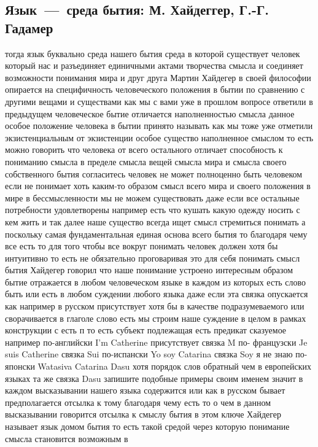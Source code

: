 \subsection{Язык~---~среда бытия: М. Хайдеггер, Г.-Г. Гадамер}
тогда язык буквально среда нашего бытия среда в которой существует человек
который нас и разъединяет единичными актами творчества смысла и соединяет
возможности понимания мира и друг друга Мартин Хайдегер в своей философии
опирается на специфичность человеческого положения в бытии по сравнению с
другими вещами и существами как мы с вами уже в прошлом вопросе ответили в
предыдущем человеческое бытие отличается наполненностью смысла данное особое
положение человека в бытии принято называть как мы тоже уже отметили
экзистенциальным от экзистенции особое существо наполненное смыслом то есть
можно говорить что человека от всего остального отличает способность к пониманию
смысла в пределе смысла вещей смысла мира и смысла своего собственного бытия
согласитесь человек не может полноценно быть человеком если не понимает хоть
каким-то образом смысл всего мира и своего положения в мире в бессмысленности мы
не можем существовать даже если все остальные потребности удовлетворены например
есть что кушать какую одежду носить с кем жить и так далее наше существо всегда
ищет смысл стремиться понимать а поскольку самая фундаментальная единая основа
всего бытия то благодаря чему все есть то для того чтобы все вокруг понимать
человек должен хотя бы интуитивно то есть не обязательно проговаривая это для
себя понимать смысл бытия Хайдегер говорил что наше понимание устроено
интересным образом бытие отражается в любом человеческом языке в каждом из
которых есть слово быть или есть в любом суждении любого языка даже если эта
связка опускается как например в русском присутствует хотя бы в качестве
подразумеваемого или сворачивается в глаголе слово есть мы строим наше суждение
в целом в рамках конструкции с есть п то есть субъект подлежащая есть предикат
сказуемое например по-английски I'm Catherine присутствует связка M по-
французски Je suis Catherine связка Sui по-испански Yo soy Catarina связка Soy я
не знаю по-японски Watasiva Catarina Dasu хотя порядок слов обратный чем в
европейских языках та же связка Dasu запишите подобные примеры своим именем
значит в каждом высказывании нашего языка содержится или как в русском бывает
предполагается отсылка к тому благодаря чему есть то о чем в данном высказывании
говорится отсылка к смыслу бытия в этом ключе Хайдегер называет язык домом бытия
то есть такой средой через которую понимание смысла становится возможным в
